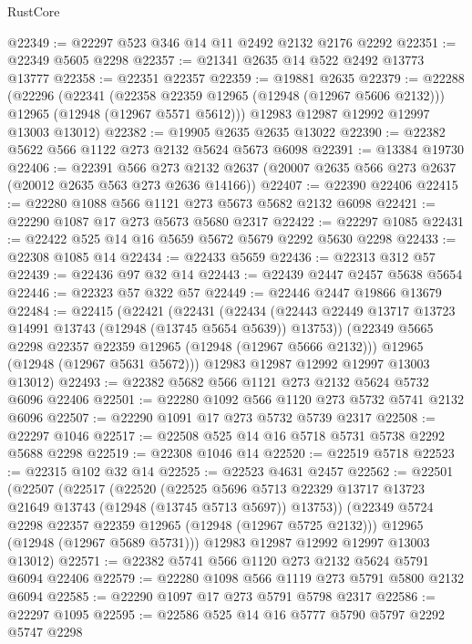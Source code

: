 \begin{lexlean}{RustCore}
\begin{coremodule}
@22349 := @22297 @523 @346 @14 @11 @2492 @2132 @2176 @2292
@22351 := @22349 @5605 @2298
@22357 := @21341 @2635 @14 @522 @2492 @13773 @13777
@22358 := @22351 @22357
@22359 := @19881 @2635
@22379 := @22288
    (@22296
      (@22341
        (@22358 @22359 @12965 (@12948 (@12967 @5606 @2132)))
        @12965
        (@12948 (@12967 @5571 @5612)))
      @12983
      @12987
      @12992
      @12997
      @13003
      @13012)
@22382 := @19905 @2635 @2635 @13022
@22390 := @22382 @5622 @566 @1122 @273 @2132 @5624 @5673 @6098
@22391 := @13384 @19730
@22406 := @22391
    @566
    @273
    @2132
    @2637
    (@20007 @2635 @566 @273 @2637 (@20012 @2635 @563 @273 @2636 @14166))
@22407 := @22390 @22406
@22415 := @22280 @1088 @566 @1121 @273 @5673 @5682 @2132 @6098
@22421 := @22290 @1087 @17 @273 @5673 @5680 @2317
@22422 := @22297 @1085
@22431 := @22422 @525 @14 @16 @5659 @5672 @5679 @2292 @5630 @2298
@22433 := @22308 @1085 @14
@22434 := @22433 @5659
@22436 := @22313 @312 @57
@22439 := @22436 @97 @32 @14
@22443 := @22439 @2447 @2457 @5638 @5654
@22446 := @22323 @57 @322 @57
@22449 := @22446 @2447 @19866 @13679
@22484 := @22415
    (@22421
      (@22431
        (@22434 (@22443 @22449 @13717 @13723 @14991 @13743 (@12948 (@13745 @5654 @5639)) @13753))
        (@22349 @5665 @2298 @22357 @22359 @12965 (@12948 (@12967 @5666 @2132)))
        @12965
        (@12948 (@12967 @5631 @5672)))
      @12983
      @12987
      @12992
      @12997
      @13003
      @13012)
@22493 := @22382 @5682 @566 @1121 @273 @2132 @5624 @5732 @6096 @22406
@22501 := @22280 @1092 @566 @1120 @273 @5732 @5741 @2132 @6096
@22507 := @22290 @1091 @17 @273 @5732 @5739 @2317
@22508 := @22297 @1046
@22517 := @22508 @525 @14 @16 @5718 @5731 @5738 @2292 @5688 @2298
@22519 := @22308 @1046 @14
@22520 := @22519 @5718
@22523 := @22315 @102 @32 @14
@22525 := @22523 @4631 @2457
@22562 := @22501
    (@22507
      (@22517
        (@22520
          (@22525
            @5696
            @5713
            @22329
            @13717
            @13723
            @21649
            @13743
            (@12948 (@13745 @5713 @5697))
            @13753))
        (@22349 @5724 @2298 @22357 @22359 @12965 (@12948 (@12967 @5725 @2132)))
        @12965
        (@12948 (@12967 @5689 @5731)))
      @12983
      @12987
      @12992
      @12997
      @13003
      @13012)
@22571 := @22382 @5741 @566 @1120 @273 @2132 @5624 @5791 @6094 @22406
@22579 := @22280 @1098 @566 @1119 @273 @5791 @5800 @2132 @6094
@22585 := @22290 @1097 @17 @273 @5791 @5798 @2317
@22586 := @22297 @1095
@22595 := @22586 @525 @14 @16 @5777 @5790 @5797 @2292 @5747 @2298

\end{coremodule}
\end{lexlean}
